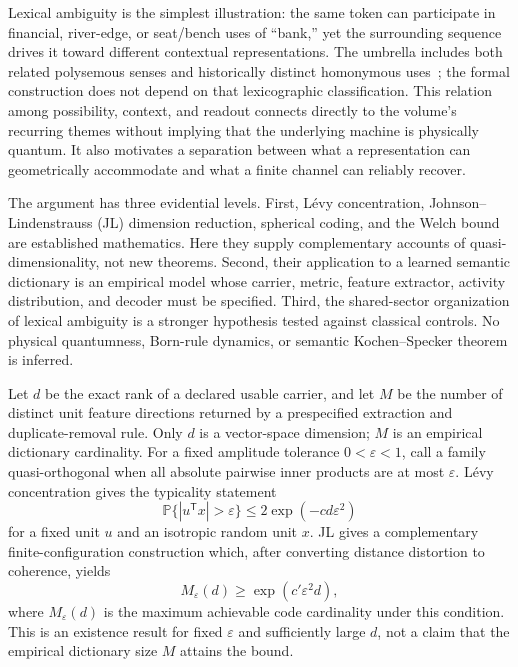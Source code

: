 \documentclass[
  aps,
  reprint,
  superscriptaddress,
  floatfix,
  nofootinbib,
  longbibliography
]{revtex4-2}
\newcommand{\Prob}{\mathbb{P}}
\newcommand{\Msem}{M}
\newcommand{\T}{^{\mathsf{T}}}
\begin{document}
Lexical ambiguity is the simplest illustration: the same token can
participate in financial, river-edge, or seat/bench uses of ``bank,'' yet the
surrounding sequence drives it toward different contextual representations.
The umbrella includes both related polysemous senses and historically distinct
homonymous uses~\cite{pustejovsky1995}; the formal construction does not depend
on that lexicographic classification.  This relation among possibility,
context, and readout
connects directly to the volume's recurring themes without implying that the
underlying machine is physically quantum.  It also motivates a separation
between what a representation can geometrically accommodate and what a
finite channel can reliably recover.



The argument has three evidential levels.  First, L\'evy concentration,
Johnson--Lindenstrauss (JL) dimension reduction, spherical coding, and the
Welch bound are established mathematics.  Here they supply complementary
accounts of quasi-dimensionality, not new theorems.  Second, their application
to a learned semantic dictionary is an empirical model whose carrier, metric,
feature extractor, activity distribution, and decoder must be specified.
Third, the shared-sector organization of lexical ambiguity is a stronger hypothesis
tested against classical controls.  No physical quantumness, Born-rule
dynamics, or semantic Kochen--Specker theorem is inferred.

Let $d$ be the exact rank of a declared usable carrier, and let $\Msem$ be the
number of distinct unit feature directions returned by a prespecified
extraction and duplicate-removal rule.  Only $d$ is a vector-space dimension;
$\Msem$ is an empirical dictionary cardinality.  For a fixed amplitude
tolerance $0<\varepsilon<1$, call a family quasi-orthogonal when all absolute
pairwise inner products are at most $\varepsilon$.  L\'evy concentration gives
the typicality statement
%
\begin{equation}
\label{eq:intro-levy}
\Prob\{|u\T x|>\varepsilon\}
\leq 2\exp(-c d\varepsilon^2)
\end{equation}
%
for a fixed unit $u$ and an isotropic random unit $x$.  JL gives a complementary
finite-configuration construction which, after converting distance distortion
to coherence, yields
%
\begin{equation}
\label{eq:intro-jl}
M_\varepsilon(d)\geq\exp(c'\varepsilon^2d),
\end{equation}
%
where $M_\varepsilon(d)$ is the maximum achievable code cardinality under this
condition.  This is an existence result for fixed $\varepsilon$ and
sufficiently large $d$, not a claim that the empirical dictionary size
$\Msem$ attains the bound.
\end{document}

